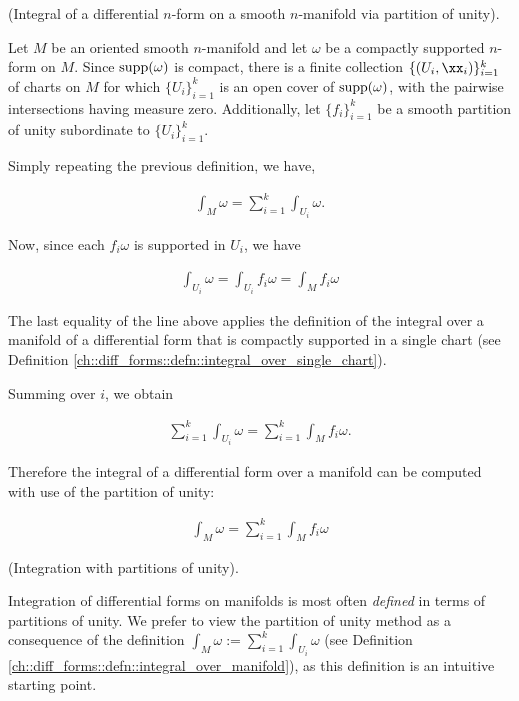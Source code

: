 \begin{theorem}
\label{ch::diff_forms::thm::integral_via_partition_of_unity}

    (Integral of a differential $n$-form on a smooth $n$-manifold via partition of unity).
    
    Let $M$ be an oriented smooth $n$-manifold and let $\omega$ be a compactly supported $n$-form on $M$. Since $\text{supp}(\omega)$ is compact, there is a finite collection $\{(U_i, \xx_i)\}_{i = 1}^k$ of charts on $M$ for which $\{U_i\}_{i = 1}^k$ is an open cover of $\text{supp}(\omega)$, with the pairwise intersections having measure zero. Additionally, let $\{f_i\}_{i = 1}^k$ be a smooth partition of unity subordinate to $\{U_i\}_{i = 1}^k$.
    
    Simply repeating the previous definition, we have,  

    \begin{align*}
        \int_M \omega = \sum_{i = 1}^k \int_{U_i} \omega.
    \end{align*}
    
    Now, since each $f_i \omega$ is supported in $U_i$, we have
    
    \begin{align*}
        \int_{U_i} \omega = \int_{U_i} f_i \omega = \int_M f_i \omega
    \end{align*}

    The last equality of the line above applies the definition of the integral over a manifold of a differential form that is compactly supported in a single chart (see Definition \ref{ch::diff_forms::defn::integral_over_single_chart}).
    
    Summing over $i$, we obtain
    
    \begin{align*}
        \sum_{i = 1}^k \int_{U_i} \omega = \sum_{i = 1}^k \int_M f_i \omega.
    \end{align*}
    
    Therefore the integral of a differential form over a manifold can be computed with use of the partition of unity:
    
    \begin{align*}
        \boxed
        {
            \int_M \omega = \sum_{i = 1}^k \int_M f_i \omega
        }
    \end{align*}
\end{theorem}

\begin{remark}
    (Integration with partitions of unity).
    
    Integration of differential forms on manifolds is most often \textit{defined} in terms of partitions of unity. We prefer to view the partition of unity method as a consequence of the definition $\int_M \omega := \sum_{i = 1}^k \int_{U_i} \omega$ (see Definition \ref{ch::diff_forms::defn::integral_over_manifold}), as this definition is an intuitive starting point.
\end{remark}

